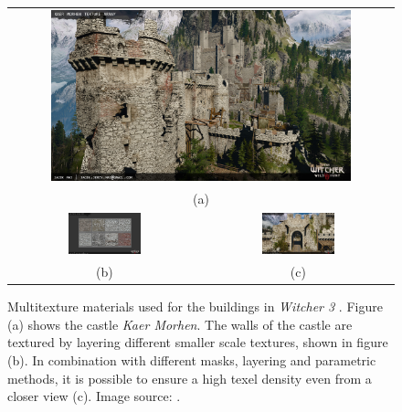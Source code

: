 \begin{figure}	
	\centering\small 
	\begin{tabular}{cc}
		\multicolumn{2}{c}{\includegraphics[width=0.8\textwidth]{images/01cha_03_jacek-maj-km-walls-04.jpg}} \\
		\multicolumn{2}{c}{(a)} \\
		[6pt]	\includegraphics[width=0.4\textwidth]{images/01cha_04_jacek-maj-km-textures.jpg} &
		\includegraphics[width=0.4\textwidth]{images/01cha_05_jacek-maj-km-walls-01.jpg}
		\\
		(b) & (c)
		\\[6pt]	
	\end{tabular}
	\caption{Multitexture materials used for the buildings in \emph{Witcher 3} \cite{witcher2015cdproject}. Figure (a) shows the castle \emph{Kaer Morhen}. The walls of the castle are textured by layering different smaller scale textures, shown in figure (b). In combination with different masks, layering and parametric methods, it is possible to ensure a high texel density even from a closer view (c). Image source: \cite{maj2016witcherMaterial}. }
	\label{fig:witcherArchitectualMaterial}
\end{figure}


